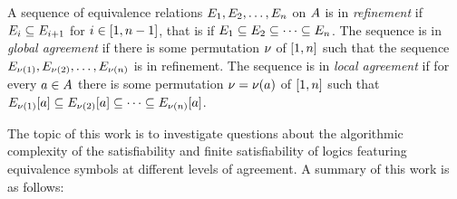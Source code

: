 
A sequence of equivalence relations $E_{1},E_{2},\dots,E_{n}$ on $A$
is in \emph{refinement} if $E_{i}\subseteq E_{i+1}$ for
$i\in[1,n-1]$, that is if
$E_{1}\subseteq E_{2}\subseteq\dots\subseteq E_{n}$.
The sequence is in \emph{global agreement} if there is some permutation
$\nu$ of $[1,n]$ such that the sequence
$E_{\nu(1)}, E_{\nu(2)}, \dots, E_{\nu(n)}$ is in
refinement.
The sequence is in \emph{local agreement} if for every $a\in A$ there is
some permutation $\nu = \nu(a)$ of $[1,n]$ such that
$E_{\nu(1)}[a]\subseteq E_{\nu(2)}[a]\subseteq\dots\subseteq E_{\nu(n)}[a]$.

The topic of this work is to investigate questions about the algorithmic
complexity of the satisfiability and finite satisfiability of logics featuring
equivalence symbols at different levels of agreement.
A summary of this work is as follows:
